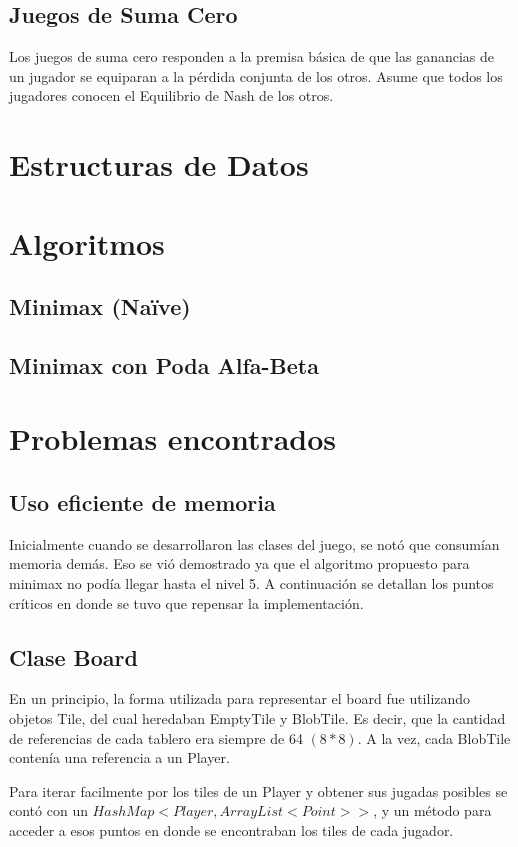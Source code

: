 \documentclass[10pt,a4paper,notitlepage,draft]{article}
\begin{document}
\subsection{Juegos de Suma Cero}

Los juegos de suma cero responden a la premisa básica de que las ganancias de un jugador se equiparan a la pérdida conjunta de los otros. Asume que todos los jugadores conocen el Equilibrio de Nash de los otros.

\section{Estructuras de Datos}
\section{Algoritmos}
\subsection{Minimax (Na\"ive)}
\subsection{Minimax con Poda Alfa-Beta}
\section{Problemas encontrados}
\subsection{Uso eficiente de memoria}
  Inicialmente cuando se desarrollaron las clases del juego, se notó que consumían memoria demás.
  Eso se vió demostrado ya que el algoritmo propuesto para minimax no podía llegar hasta el nivel 5.
  A continuación se detallan los puntos críticos en donde se tuvo que repensar la implementación.

  \subsection{Clase Board}
    En un principio, la forma utilizada para representar el board fue utilizando objetos Tile, del cual heredaban EmptyTile y BlobTile.
    Es decir, que la cantidad de referencias de cada tablero era siempre de 64 $(8 * 8)$.  A la vez, cada BlobTile contenía una referencia a un Player.

    Para iterar facilmente por los tiles de un Player y obtener sus jugadas posibles se contó con un $HashMap<Player, ArrayList<Point>>$, y un método para acceder a esos  puntos en donde se encontraban los tiles de cada jugador.
\end{document}
